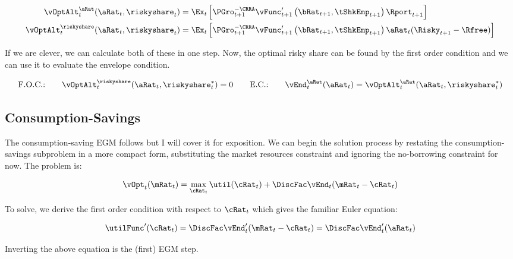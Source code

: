 \documentclass[\econtexRoot/SequentialEGM]{subfiles}
\begin{document}
\begin{equation}
	\begin{split}
		\vOptAlt_{t}^{\aRat}(\aRat_{t}, \riskyshare_{t}) & =  \Ex_{t} \left[ \PGro_{t+1}^{-\CRRA} \vFunc_{t+1}'\left(\bRat_{t+1}, \tShkEmp_{t+1}\right) \Rport_{t+1}   \right] \\
		\vOptAlt_{t}^{\riskyshare}(\aRat_{t}, \riskyshare_{t}) & =  \Ex_{t} \left[ \PGro_{t+1}^{-\CRRA} \vFunc_{t+1}'\left(\bRat_{t+1}, \tShkEmp_{t+1}\right) \aRat_{t} (\Risky_{t+1} - \Rfree)   \right] \\
	\end{split}
\end{equation}

If we are clever, we can calculate both of these in one step. Now, the optimal risky share can be found by the first order condition and we can use it to evaluate the envelope condition.

\begin{equation}
	\text{F.O.C.:} \qquad \vOptAlt_{t}^{\riskyshare}(\aRat_{t}, \riskyshare_{t}^{*})  = 0 \qquad
	\text{E.C.:} \qquad \vEnd_{t}^{\aRat}(\aRat_{t}) = \vOptAlt_{t}^{\aRat}(\aRat_{t}, \riskyshare_{t}^{*})
\end{equation}

\subsection{Consumption-Savings}

The consumption-saving EGM follows \cite{Carroll2006-wq} but I will cover it for exposition. We can begin the solution process by restating the consumption-savings subproblem in a more compact form, substituting the market resources constraint and ignoring the no-borrowing constraint for now. The problem is:

\begin{equation}
	\vOpt_{t}(\mRat_{t}) = \max_{\cRat_{t}} \util(\cRat_{t}) +
	\DiscFac \vEnd_{t}(\mRat_{t}-\cRat_{t})
\end{equation}

To solve, we derive the first order condition with respect to $\cRat_{t}$ which gives the familiar Euler equation:

\begin{equation}
	\utilFunc'(\cRat_t) = \DiscFac \vEnd_{t}'(\mRat_{t} - \cRat_{t}) = \DiscFac
	\vEnd_{t}'(\aRat_{t})
\end{equation}

Inverting the above equation is the (first) EGM step.
\end{document}
